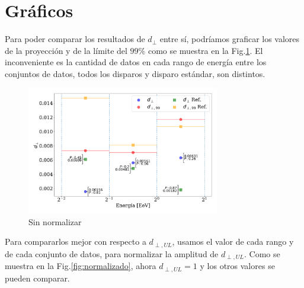     \section{Gráficos}

    Para poder comparar los resultados de $d_\perp$ entre sí, podríamos graficar los valores de la proyección y de la límite del $99\%$ como se muestra en la Fig.\ref{fig:no_normalizado}. El inconveniente es la cantidad de datos en cada rango de energía entre los conjuntos de datos, todos los disparos y disparo estándar, son distintos.



    \begin{figure}[H]
        \begin{small}
            \begin{center}
                \includegraphics[width=0.75\textwidth]{d_perp_no_normalizado_v2.pdf}
            \end{center}
            \caption{Sin normalizar}
            \label{fig:no_normalizado}
        \end{small}
    \end{figure}
    
    Para compararlos mejor con respecto a $d_{\perp,UL}$, usamos el valor de cada rango y de cada conjunto de datos, para normalizar la amplitud de $d_{\perp,UL}$. Como se muestra en la Fig.\ref{fig:normalizado}, ahora $d_{\perp,UL}=1$ y los otros valores se pueden comparar. 


